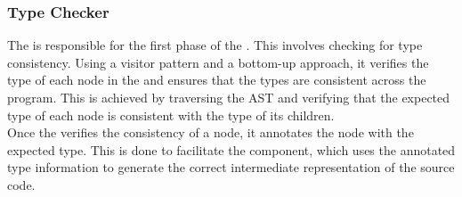 \subsubsection{Type Checker}

The \typeChecker{} is responsible for the first phase of the \static. This involves
checking \ast{} for type consistency. Using a visitor pattern and a bottom-up
approach, it verifies the type of each node in the \ast{} and ensures that the types
are consistent across the program. This is achieved by traversing the AST and
verifying that the expected type of each node is consistent with the type of its
children. \\

Once the \typeChecker{} verifies the consistency of a node, it annotates the node
with the expected type. This is done to facilitate the \codeGen{} component, which
uses the annotated type information to generate the correct intermediate
representation of the source code.
